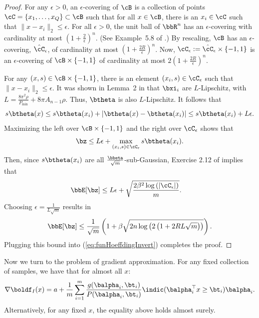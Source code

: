 \documentclass[letterpaper, 10 pt, conference]{ieeeconf}  %
\begin{document}
\begin{proof}
For any $\epsilon>0$, an $\epsilon$-covering of $\cB$ is a collection of points $\cC=\{x_1,\ldots,x_Q\}\subset\cB$ such that for all $x\in\cB$, there is an $x_i\in\cC$ such that $\|x-x_i\|_2\le \epsilon$. For all $\epsilon >0$, the unit ball of $\bbR^n$ has an $\epsilon$-covering with cardinality at most $\left(1+\frac{2}{\epsilon}\right)^{n}$. (See Example~5.8 of \cite{wainwright2019high}.) By rescaling, $\cB$ has an $\epsilon$-covering, $\hat\cC_{\epsilon}$, of cardinality at most $\left(1+\frac{2R}{\epsilon}\right)^n$. Now, $\cC_{\epsilon}:=\hat\cC_{\epsilon}\times \{-1,1\}$ is an $\epsilon$-covering of $\cB\times\{-1,1\}$ of cardinality at most $2\left(1+\frac{2R}{\epsilon}\right)^n$.

For any $(x,s)\in\cB\times \{-1,1\}$, there is an element $(x_i,s)\in\cC_{\epsilon}$ such that $\|x-x_i\|_2\le \epsilon$. It was shown in Lemma~2 in \cite{lamperski2024approximation} that $\bxi_i$ are $L$-Lipschitz, with $L=\frac{8\pi^2 \rho}{P_{\min}}+8\pi A_{n-1} \rho$. Thus, $\btheta$ is also $L$-Lipschitz. It follows that
$$
s\btheta(x)\le s\btheta(x_i)+|\btheta(x)-\btheta(x_i)|\le s\btheta(x_i)+L\epsilon. 
$$
Maximizing the left over $\cB\times\{-1,1\}$ and the right over $\cC_{\epsilon}$ shows that
$$
\bz\le L\epsilon+\max_{(x_i,s)\in\cC_{\epsilon}}s\btheta(x_i).
$$
Then, since $s\btheta(x_i)$ are all $\frac{\bbeta}{\sqrt{m}}$-sub-Gaussian, Exercise 2.12 of \cite{wainwright2019high} implies that
\begin{align*}
  \bbE[\bz]&\le L\epsilon+\sqrt{\frac{2\beta^2 \log\left(|\cC_{\epsilon}| \right)}{m}}.
\end{align*}
Choosing $\epsilon=\frac{1}{L\sqrt{m}}$ results in
$$
\bbE[\bz]\le\frac{1}{\sqrt{m}}\left(
  1+\beta\sqrt{2n\log\left(2\left(1+2RL\sqrt{m}\right)\right)}
\right).
$$
Plugging this bound into (\ref{eq:funHoeffdingInvert}) completes the proof.
\end{proof}

Now we turn to the problem of gradient approximation. 
For any fixed collection of samples, we have that for almost all $x$:
\begin{align*}
  \nabla\boldf_I(x)=a + \frac{1}{m}\sum_{i=1}^m\frac{g(\balpha_i,\bt_i)}{P(\balpha_i,\bt_i)}
  \indic(\balpha_i^\top x\ge\bt_i)
  \balpha_i. 
\end{align*}
Alternatively, for any fixed $x$, the equality above holds almost surely. 
\end{document}
